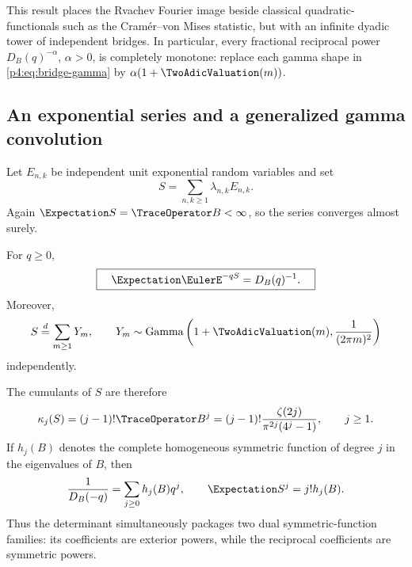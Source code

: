 \documentclass[11pt]{article}
\theoremstyle{definition}
\theoremstyle{remark}
\begin{document}
This result places the Rvachev Fourier image beside classical quadratic-functionals
such as the Cram\'er--von Mises statistic, but with an infinite dyadic tower of
independent bridges.  In particular, every fractional reciprocal power
\(D_B(q)^{-\alpha}\), \(\alpha>0\), is completely monotone: replace each gamma shape
in \eqref{p4:eq:bridge-gamma} by \(\alpha(1+\TwoAdicValuation(m))\).

\subsection{An exponential series and a generalized gamma convolution}

Let \(E_{n,k}\) be independent unit exponential random variables and set
\begin{equation}
 S=\sum_{n,k\ge1}\lambda_{n,k}E_{n,k}.
 \label{p4:eq:S-exp}
\end{equation}
Again \(\Expectation S=\TraceOperator B<\infty\), so the series converges almost surely.

\begin{proposition}
\label{p4:prop:exp-det}
For \(q\ge0\),
\begin{equation}
 \boxed{\quad
 \Expectation\EulerE^{-qS}=D_B(q)^{-1}.
 \quad}
 \label{p4:eq:exp-det}
\end{equation}
Moreover,
\begin{equation}
 S\stackrel d=\sum_{m\ge1}Y_m,
 \qquad
 Y_m\sim\operatorname{Gamma}
 \left(1+\TwoAdicValuation(m),\frac1{(2\pi m)^2}\right)
 \label{p4:eq:S-gamma}
\end{equation}
independently.
\end{proposition}

The cumulants of \(S\) are therefore
\begin{equation}
 \kappa_j(S)=(j-1)!\TraceOperator B^j
 =(j-1)!\frac{\zeta(2j)}{\pi^{2j}(4^j-1)},
 \qquad j\ge1.
 \label{p4:eq:S-cumulants}
\end{equation}
If \(h_j(B)\) denotes the complete homogeneous symmetric function of degree \(j\) in
the eigenvalues of \(B\), then
\begin{equation}
 \frac1{D_B(-q)}=\sum_{j\ge0}h_j(B)q^j,
 \qquad
 \Expectation S^j=j!h_j(B).
 \label{p4:eq:h-complete}
\end{equation}
Thus the determinant simultaneously packages two dual symmetric-function families:
its coefficients are exterior powers, while the reciprocal coefficients are symmetric
powers.
\end{document}
